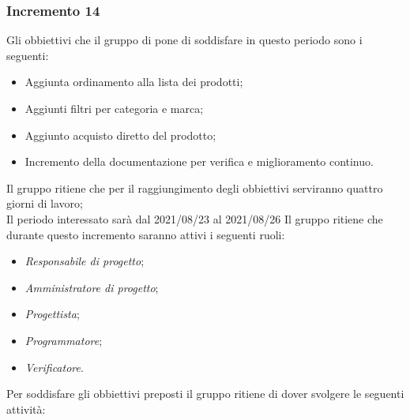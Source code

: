 \subsubsection{Incremento 14}
Gli obbiettivi che il gruppo di pone di soddisfare in questo periodo sono i seguenti:
\begin{itemize}
    \item Aggiunta ordinamento alla lista dei prodotti;
    \item Aggiunti filtri per categoria e marca;
    \item Aggiunto acquisto diretto del prodotto;
    \item Incremento della documentazione per verifica e miglioramento continuo.
\end{itemize}
Il gruppo ritiene che per il raggiungimento degli obbiettivi serviranno quattro giorni di lavoro;\\
Il periodo interessato sarà dal 2021/08/23 al 2021/08/26
Il gruppo ritiene che durante questo incremento saranno attivi i seguenti ruoli:
\begin{itemize}
    \item \textit{Responsabile di progetto};
    \item \textit{Amministratore di progetto};
    \item \textit{Progettista};
    \item \textit{Programmatore};
    \item \textit{Verificatore}.
\end{itemize}
Per soddisfare gli obbiettivi preposti il gruppo ritiene di dover svolgere le seguenti attività:
